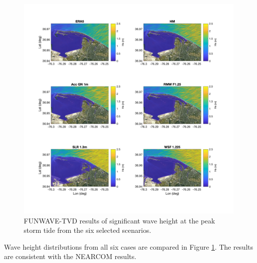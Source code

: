 \documentclass[11pt]{article}
\begin{document}
\begin{figure}[h!]
\centering
\includegraphics[width=\textwidth]{./figures/funwave_hs_6_cases.jpg}
\caption{FUNWAVE-TVD results of significant wave height  at the peak storm tide from the six selected scenarios. }
\label{funwave_6_cases_hs}
\centering
\end{figure}

Wave height distributions from all six cases are compared in Figure \ref{funwave_6_cases_hs}. The results are consistent with the NEARCOM results. 
\end{document}
